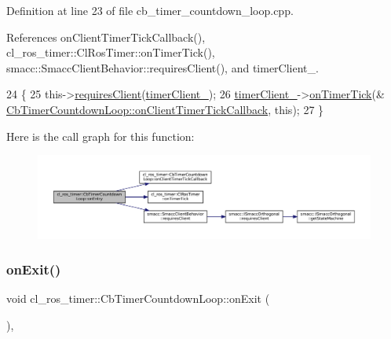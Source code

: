 Definition at line 23 of file cb\+\_\+timer\+\_\+countdown\+\_\+loop.\+cpp.



References on\+Client\+Timer\+Tick\+Callback(), cl\+\_\+ros\+\_\+timer\+::\+Cl\+Ros\+Timer\+::on\+Timer\+Tick(), smacc\+::\+Smacc\+Client\+Behavior\+::requires\+Client(), and timer\+Client\+\_\+.


\begin{DoxyCode}
24 \{
25     this->\hyperlink{classsmacc_1_1SmaccClientBehavior_a917f001e763a1059af337bf4e164f542}{requiresClient}(\hyperlink{classcl__ros__timer_1_1CbTimerCountdownLoop_acca81b8f1807f8e8faf692fb3f9e4dbd}{timerClient\_});
26     \hyperlink{classcl__ros__timer_1_1CbTimerCountdownLoop_acca81b8f1807f8e8faf692fb3f9e4dbd}{timerClient\_}->\hyperlink{classcl__ros__timer_1_1ClRosTimer_a7edcc057bfb5a25fe0892755137dd8da}{onTimerTick}(&
      \hyperlink{classcl__ros__timer_1_1CbTimerCountdownLoop_acb16f3448ad5955bf36e7c2cfd9f691c}{CbTimerCountdownLoop::onClientTimerTickCallback}, \textcolor{keyword}{this});
27 \}
\end{DoxyCode}
Here is the call graph for this function\+:
\nopagebreak
\begin{figure}[H]
\begin{center}
\leavevmode
\includegraphics[width=350pt]{classcl__ros__timer_1_1CbTimerCountdownLoop_aa088f15db4fb2c307c86b30b2e1f7744_cgraph}
\end{center}
\end{figure}
\mbox{\label{classcl__ros__timer_1_1CbTimerCountdownLoop_a5623e9fdd8f0fb23e8707f7816c099d6}} 
\subsubsection{\texorpdfstring{on\+Exit()}{onExit()}}
{\footnotesize\ttfamily void cl\+\_\+ros\+\_\+timer\+::\+Cb\+Timer\+Countdown\+Loop\+::on\+Exit (\begin{DoxyParamCaption}{ }\end{DoxyParamCaption})\hspace{0.3cm}{\ttfamily [override]}, {\ttfamily [virtual]}}



